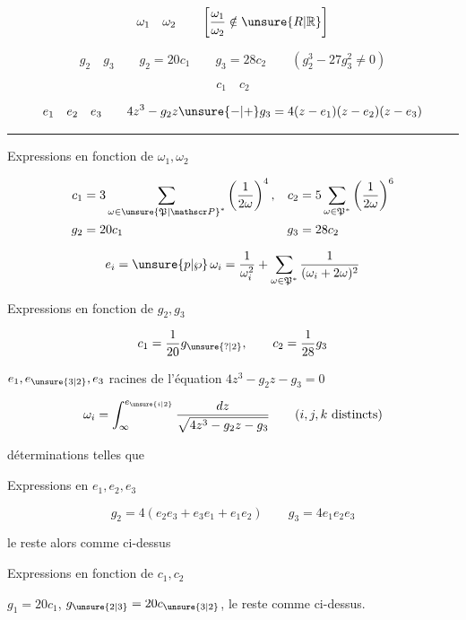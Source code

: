 \[
\omega_1\quad\omega_2\qquad\left[\frac{\omega_1}{\omega_2}\notin\unsure{R|\mathbb R}\right]
\]

\[
g_2\quad g_3\qquad\boxed{g_2=20c_1\qquad g_3=28c_2}\qquad(g_2^3-27g_3^2\ne0)
\]

\[c_1\quad c_2\]

\[
e_1\quad e_2\quad e_3\qquad 4z^3-g_2z\unsure{-|+}g_3=4(z-e_1)(z-e_2)(z-e_3)
\]

\noindent\rule{.4\linewidth}{.4pt}

Expressions en fonction de $\omega_1,\omega_2$

\[
\begin{aligned}
c_1&=3\sum_{\omega\in{\unsure{\mathfrak P|\mathscr P}}^{*}}\left(\frac1{2\omega}\right)^4,&
c_2&=5\sum_{\omega\in\mathfrak P^{*}}\left(\frac1{2\omega}\right)^6\\
g_2&=20c_1&g_3&=28c_2
\end{aligned}
\]

\[
e_i=\unsure{p|\wp}\,\omega_i=\frac1{\omega_i^2}+\sum_{\omega\in\mathfrak P^{*}}\frac1{(\omega_i+2\omega)^2}
\]

Expressions en fonction de $g_2,g_3$ 

\[
c_1=\frac1{20}g_{\unsure{?|2}},\qquad c_2=\frac1{28}g_3
\]

$e_1,e_{\unsure{3|2}},e_3$ racines de l'équation $4z^3-g_2z-g_3=0$

\[
\omega_i=\int_{\infty}^{e_{\unsure{i|2}}}\frac{dz}{\sqrt{4z^3-g_2z-g_3}}\qquad(i,j,k\ \text{distincts})
\]

déterminations telles que  


Expressions en  $e_1,e_2,e_3$

\[
g_2=4(e_2e_3+e_3e_1+e_1e_2)\qquad g_3=4e_1e_2e_3
\]

le reste alors comme ci-dessus

Expressions en fonction de $c_1,c_2$

$g_1=20c_1$, $g_{\unsure{2|3}}=20c_{\unsure{3|2}}$, le reste comme ci-dessus.


